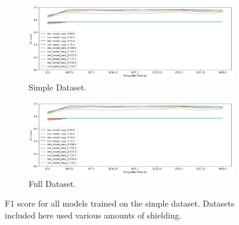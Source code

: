 \begin{figure}[H]
     \centering
     \begin{subfigure}[b]{0.9\textwidth}
         \centering
         \includegraphics[width=\textwidth]{images/results_easy_distance_comparison}
         \caption{Simple Dataset.}
         \label{fig:results_easy_distance_comparison_simple}
     \end{subfigure}

     \begin{subfigure}[b]{0.9\textwidth}
         \centering
         \includegraphics[width=\textwidth]{images/results_easy_distance_comparison}
         \caption{Full Dataset.}
         \label{fig:results_easy_distance_comparison_full}
     \end{subfigure}
        \caption{F1 score for all models trained on the simple dataset. Datasets included here used various amounts of shielding.}
        \label{fig:results_easy_distance_comparison}
\end{figure}







